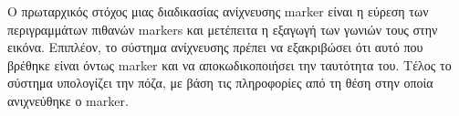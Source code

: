 Ο πρωταρχικός στόχος μιας διαδικασίας ανίχνευσης marker είναι η εύρεση των περιγραμμάτων πιθανών markers και μετέπειτα η εξαγωγή των γωνιών τους στην εικόνα. Επιπλέον, το σύστημα ανίχνευσης πρέπει να εξακριβώσει ότι αυτό που βρέθηκε είναι όντως marker και να αποκωδικοποιήσει την ταυτότητα του. 
Τέλος το σύστημα υπολογίζει την πόζα, με βάση τις πληροφορίες από τη θέση στην οποία ανιχνεύθηκε ο marker.

